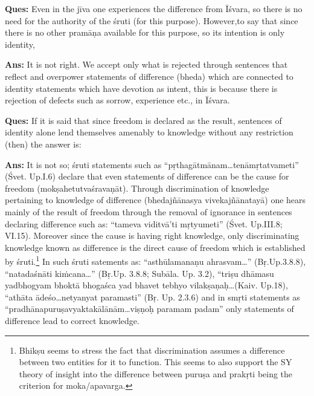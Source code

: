 \textbf{Ques:} Even in the jīva one experiences the difference from Īśvara, so there is no need for the authority of the śruti (for this purpose).  However,to say that  since there is no other pramāṇa available for this purpose, so its intention is only identity,

\textbf{Ans:} It is not right. We accept only what is rejected through sentences that reflect and overpower statements of difference (bheda) which are connected to identity statements which have devotion as intent, this is because there is rejection of defects such as sorrow, experience etc., in Īśvara.

\textbf{Ques:} If it is said that since freedom is declared as the result, sentences of identity alone lend themselves amenably to knowledge without any restriction (then) the answer is: 

\textbf{Ans:} It is not so; śruti statements such as “pṛthagātmānam…tenāmṛ\-tatvameti” (Śvet. Up.I.6) declare that even statements of difference can be the cause for freedom (mokṣahetutvaśravaṇāt). Through discrimination of knowledge pertaining to knowledge of difference (bhedajñānasya vivekajñānatayā) one hears mainly of the result of freedom through the removal of ignorance in sentences declaring difference such as: “tameva viditvā’ti mṛtyumeti” (Śvet. Up.III.8; VI.15). Moreover  since the cause  is having right knowledge, only discriminating knowledge known as difference is the direct cause of freedom which is established by śruti.\footnote{Bhikṣu seems to stress the fact that discrimination assumes a difference between two entities for it to function. This seems to also support the SY theory of insight into the difference between puruṣa and prakṛti being the criterion for moka/apavarga.} In such śruti satements as: “asthūlamanaṇu ahrasvam…” (Bṛ.Up.3.8.8), “natadaśnāti kiṁcana…” (Bṛ.Up. 3.8.8; Subāla. Up. 3.2), “triṣu dhāmasu yadbhogyam bhoktā bhogaśca yad bhavet tebhyo vilakṣaṇaḥ…(Kaiv. Up.18), “athāta ādeśo…netyanyat paramasti” (Bṛ. Up. 2.3.6) and in smṛti statements as “pradhānapuruṣavyaktakālānām…viṣṇoḥ paramam padam” only statements of difference lead to correct knowledge. 


